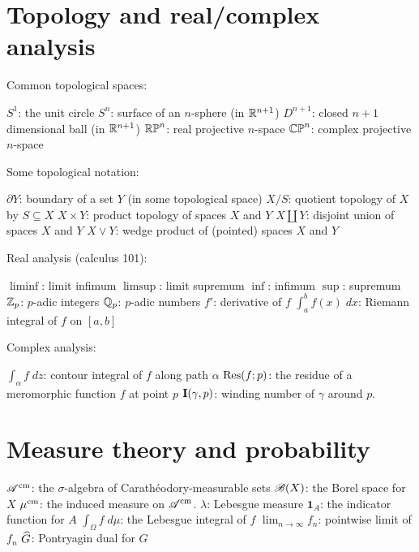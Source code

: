 \section{Topology and real/complex analysis}
Common topological spaces:
\begin{itemize}
	\ii $S^1$: the unit circle
	\ii $S^n$: surface of an $n$-sphere (in $\mathbb R^{n+1}$)
	\ii $D^{n+1}$: closed $n+1$ dimensional ball (in $\mathbb R^{n+1}$)
	\ii $\mathbb{RP}^n$: real projective $n$-space
	\ii $\mathbb{CP}^n$: complex projective $n$-space
\end{itemize}
Some topological notation:
\begin{itemize}
	\ii $\partial Y$: boundary of a set $Y$ (in some topological space)
	\ii $X/S$: quotient topology of $X$ by $S \subseteq X$
	\ii $X \times Y$: product topology of spaces $X$ and $Y$
	\ii $X \amalg Y$: disjoint union of spaces $X$ and $Y$
	\ii $X \vee Y$: wedge product of (pointed) spaces $X$ and $Y$
\end{itemize}
Real analysis (calculus 101):
\begin{itemize}
	\ii $\liminf$: limit infimum
	\ii $\limsup$: limit supremum
	\ii $\inf$: infimum
	\ii $\sup$: supremum
	\ii $\mathbb Z_p$: $p$-adic integers
	\ii $\mathbb Q_p$: $p$-adic numbers
	\ii $f'$: derivative of $f$
	\ii $\int_a^b f(x) \; dx$: Riemann integral of $f$ on $[a,b]$
\end{itemize}
Complex analysis:
\begin{itemize}
	\ii $\int_\alpha f \; dz$: contour integral of $f$ along path $\alpha$
	\ii $\operatorname{Res}(f;p)$: the residue of a meromorphic function $f$ at point $p$
	\ii $\operatorname{\mathbf I}(\gamma, p)$: winding number of $\gamma$ around $p$.
\end{itemize}
\section{Measure theory and probability}
\begin{itemize}
	\ii $\mathscr A^\text{cm}$: the $\sigma$-algebra of Carath\'{e}odory-measurable sets
	\ii $\mathscr B(X)$: the Borel space for $X$
	\ii $\mu^\text{cm}$: the induced measure on $\mathscr A^\text{cm}$.
	\ii $\lambda$: Lebesgue measure
	\ii $\mathbf{1}_A$: the indicator function for $A$
	\ii $\int_\Omega f \; d\mu$: the Lebesgue integral of $f$
	\ii $\lim_{n \to \infty} f_n$: pointwise limit of $f_n$
	\ii $\widehat G$: Pontryagin dual for $G$
\end{itemize}

